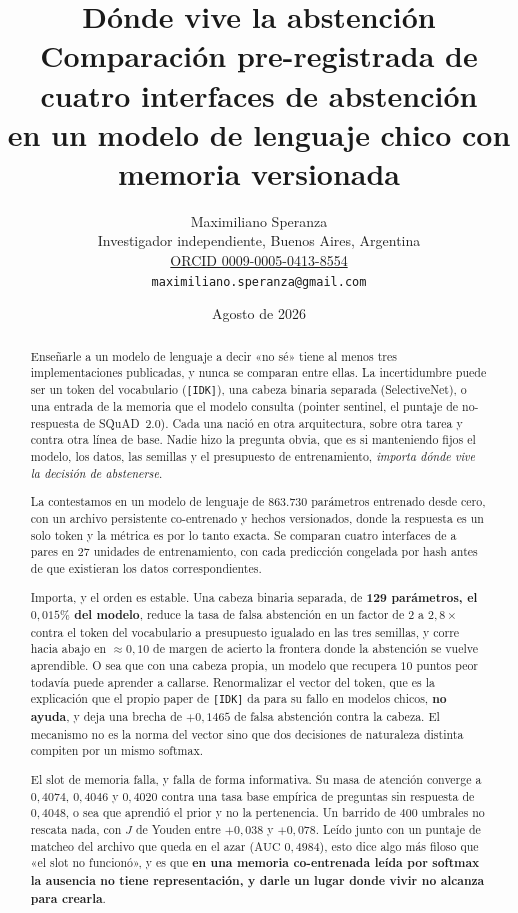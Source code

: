 \documentclass[11pt,a4paper]{article}
\title{\bfseries Dónde vive la abstención\\
Comparación pre-registrada de cuatro interfaces de abstención\\
en un modelo de lenguaje chico con memoria versionada}
\author{Maximiliano Speranza\\
\small Investigador independiente, Buenos Aires, Argentina\\
\small \href{https://orcid.org/0009-0005-0413-8554}{ORCID 0009-0005-0413-8554}\\
\small \texttt{maximiliano.speranza@gmail.com}}
\date{Agosto de 2026}
\begin{document}
\maketitle

\begin{center}
\end{center}

\begin{abstract}
\noindent
Enseñarle a un modelo de lenguaje a decir «no sé» tiene al menos tres implementaciones publicadas, y
nunca se comparan entre ellas. La incertidumbre puede ser un token del vocabulario
(\texttt{[IDK]}), una cabeza binaria separada (SelectiveNet), o una entrada de la memoria que el
modelo consulta (pointer sentinel, el puntaje de no-respuesta de SQuAD~2.0). Cada una nació en otra
arquitectura, sobre otra tarea y contra otra línea de base. Nadie hizo la pregunta obvia, que es si
manteniendo fijos el modelo, los datos, las semillas y el presupuesto de entrenamiento,
\emph{importa dónde vive la decisión de abstenerse}.

La contestamos en un modelo de lenguaje de $863{.}730$ parámetros entrenado desde cero, con un
archivo persistente co-entrenado y hechos versionados, donde la respuesta es un solo token y la
métrica es por lo tanto exacta. Se comparan cuatro interfaces de a pares en 27 unidades de
entrenamiento, con cada predicción congelada por hash antes de que existieran los datos
correspondientes.

Importa, y el orden es estable. Una cabeza binaria separada, de \textbf{129 parámetros, el
$0{,}015\%$ del modelo}, reduce la tasa de falsa abstención en un factor de $2$ a $2{,}8\times$
contra el token del vocabulario a presupuesto igualado en las tres semillas, y corre hacia abajo en
$\approx 0{,}10$ de margen de acierto la frontera donde la abstención se vuelve aprendible. O sea que
con una cabeza propia, un modelo que recupera $10$ puntos peor todavía puede aprender a callarse.
Renormalizar el vector del token, que es la explicación que el propio paper de \texttt{[IDK]} da para
su fallo en modelos chicos, \textbf{no ayuda}, y deja una brecha de $+0{,}1465$ de falsa abstención
contra la cabeza. El mecanismo no es la norma del vector sino que dos decisiones de naturaleza
distinta compiten por un mismo softmax.

El slot de memoria falla, y falla de forma informativa. Su masa de atención converge a $0{,}4074$,
$0{,}4046$ y $0{,}4020$ contra una tasa base empírica de preguntas sin respuesta de $0{,}4048$, o
sea que aprendió el prior y no la pertenencia. Un barrido de $400$ umbrales no rescata nada, con
$J$ de Youden entre $+0{,}038$ y $+0{,}078$. Leído junto con un puntaje de matcheo del archivo que
queda en el azar ($\mathrm{AUC}$ $0{,}4984$), esto dice algo más filoso que «el slot no funcionó», y
es que \textbf{en una memoria co-entrenada leída por softmax la ausencia no tiene representación, y
darle un lugar donde vivir no alcanza para crearla}.


\end{abstract}
\end{document}
